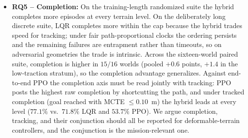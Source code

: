 \documentclass[conference]{IEEEtran}
\begin{document}
\begin{itemize}
\item \textbf{RQ5 -- Completion:} On the training-length randomized suite the hybrid completes more episodes at every terrain level. On the deliberately long discrete suite, LQR completes more within the cap because the hybrid trades speed for tracking; under fair path-proportional clocks the ordering persists and the remaining failures are entrapment rather than timeouts, so on adversarial geometries the trade is intrinsic. Across the sixteen-world paired suite, completion is higher in $15/16$ worlds (pooled $+0.6$ points, $+1.4$ in the low-traction stratum), so the completion advantage generalizes. Against end-to-end PPO the completion axis must be read jointly with tracking: PPO posts the highest raw completion by shortcutting the path, and under tracked completion (goal reached with MCTE $\le 0.10$~m) the hybrid leads at every level ($77.1\%$ vs.\ $71.8\%$ LQR and $53.7\%$ PPO). We argue completion, tracking, and their conjunction should all be reported for deformable-terrain controllers, and the conjunction is the mission-relevant one.
\end{itemize}
\end{document}
